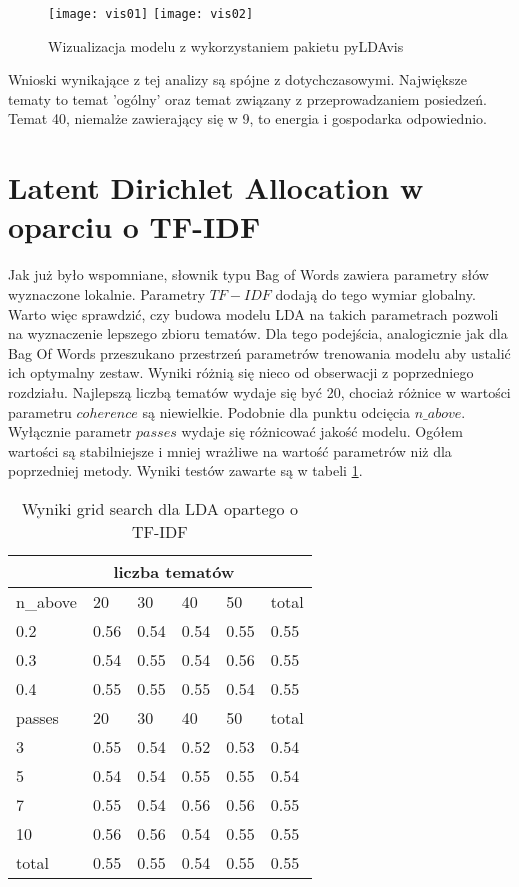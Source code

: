 \documentclass[a4paper,11pt,twoside]{report}
\theoremstyle{definition}
\begin{document}
\begin{figure}
\texttt{[image: vis01]} 
\texttt{[image: vis02]} 
\centering \caption{Wizualizacja modelu z wykorzystaniem pakietu pyLDAvis}
 \label{vis01}
\end{figure}

Wnioski wynikające z tej analizy są spójne z dotychczasowymi. Największe tematy to temat 'ogólny' oraz temat związany z przeprowadzaniem posiedzeń. Temat 40, niemalże zawierający się w 9, to energia i gospodarka odpowiednio.



\section{Latent Dirichlet Allocation w oparciu o TF-IDF}
Jak już było wspomniane, słownik typu Bag of Words zawiera parametry słów wyznaczone lokalnie. Parametry $TF-IDF$ dodają do tego wymiar globalny. Warto więc sprawdzić, czy budowa modelu LDA na takich parametrach pozwoli na wyznaczenie lepszego zbioru tematów.
Dla tego podejścia, analogicznie jak dla Bag Of Words przeszukano przestrzeń parametrów trenowania modelu aby ustalić ich optymalny zestaw. Wyniki różnią się nieco od obserwacji z poprzedniego rozdziału. Najlepszą liczbą tematów wydaje się być 20, chociaż różnice w wartości parametru $coherence$ są niewielkie. Podobnie dla punktu odcięcia $n\_above$. Wyłącznie parametr $passes$ wydaje się różnicować jakość modelu. Ogółem wartości są stabilniejsze i mniej wrażliwe na wartość parametrów niż dla poprzedniej metody. Wyniki testów zawarte są w tabeli \ref{tab:gs03}.


\begin{table}  \centering
\begin{tabular}{ |p{2.5cm}||p{1.8cm}|p{1.8cm}|p{1.8cm}|p{1.8cm}||p{1.8cm}| }
 \hline
      &  \multicolumn{4}{|c||}{liczba tematów} &    \\

 \hline
n\_above & 20 & 30 & 40 & 50 & total \\
 \hline
0.2	 & 0.56 & 	0.54 & 	0.54 & 	0.55 & 0.55\\
0.3	 & 0.54 & 	0.55 & 	0.54 & 	0.56 & 0.55\\
0.4	 & 0.55 & 	0.55 & 	0.55 & 	0.54 & 0.55\\
 \hline \hline
passes & 20 & 30 & 40 & 50 & total \\
\hline
3 & 	0.55 & 	0.54 & 	0.52	 & 0.53	 & 0.54	\\
5 & 	0.54 & 	0.54 & 	0.55	 & 0.55	 & 0.54 \\
7 & 	0.55 & 	0.54 & 	0.56	 & 0.56	 & 0.55\\
10 & 0.56 & 	0.56 & 	0.54 & 	0.55	 & 0.55	\\
\hline \hline
total &		0.55 & 	0.55	 & 0.54 & 	0.55	 & 0.55\\
\hline
\end{tabular} \caption{Wyniki grid search dla LDA opartego o TF-IDF} 
\label{tab:gs03}
\end{table}
\end{document}
